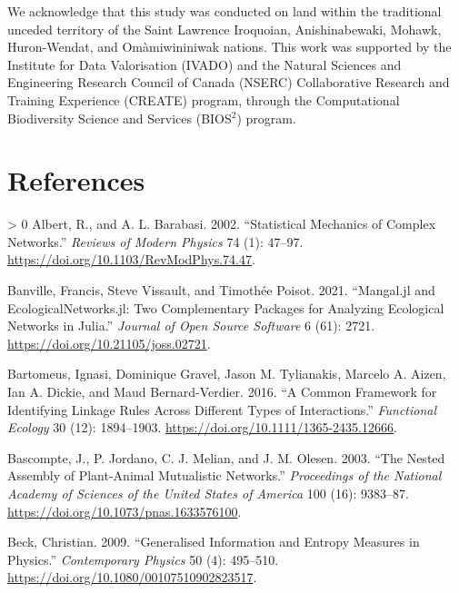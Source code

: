 \documentclass[10pt,oneside]{article}
\newlength{\cslhangindent}
\newenvironment{CSLReferences}[3] %
 {%
  \setlength{\parindent}{0pt}
  \ifodd #1 \everypar{\setlength{\hangindent}{\cslhangindent}}\ignorespaces\fi
  \ifnum #2 > 0
  \setlength{\parskip}{#2\baselineskip}
  \fi
 }%
 {}
\begin{document}
We acknowledge that this study was conducted on land within the
traditional unceded territory of the Saint Lawrence Iroquoian,
Anishinabewaki, Mohawk, Huron-Wendat, and Omàmiwininiwak nations. This
work was supported by the Institute for Data Valorisation (IVADO) and
the Natural Sciences and Engineering Research Council of Canada (NSERC)
Collaborative Research and Training Experience (CREATE) program, through
the Computational Biodiversity Science and Services (BIOS\(^2\))
program.

\hypertarget{references}{%
\section*{References}\label{references}}

\hypertarget{refs}{}
\begin{CSLReferences}{1}{0}
\leavevmode\hypertarget{ref-Albert2002StaMec}{}%
Albert, R., and A. L. Barabasi. 2002. {``Statistical Mechanics of
Complex Networks.''} \emph{Reviews of Modern Physics} 74 (1): 47--97.
\url{https://doi.org/10.1103/RevModPhys.74.47}.

\leavevmode\hypertarget{ref-Banville2021ManJla}{}%
Banville, Francis, Steve Vissault, and Timothée Poisot. 2021.
{``Mangal.jl and EcologicalNetworks.jl: Two Complementary Packages for
Analyzing Ecological Networks in Julia.''} \emph{Journal of Open Source
Software} 6 (61): 2721. \url{https://doi.org/10.21105/joss.02721}.

\leavevmode\hypertarget{ref-Bartomeus2016ComFra}{}%
Bartomeus, Ignasi, Dominique Gravel, Jason M. Tylianakis, Marcelo A.
Aizen, Ian A. Dickie, and Maud Bernard-Verdier. 2016. {``A Common
Framework for Identifying Linkage Rules Across Different Types of
Interactions.''} \emph{Functional Ecology} 30 (12): 1894--1903.
\url{https://doi.org/10.1111/1365-2435.12666}.

\leavevmode\hypertarget{ref-Bascompte2003NesAssa}{}%
Bascompte, J., P. Jordano, C. J. Melian, and J. M. Olesen. 2003. {``The
Nested Assembly of Plant-Animal Mutualistic Networks.''}
\emph{Proceedings of the National Academy of Sciences of the United
States of America} 100 (16): 9383--87.
\url{https://doi.org/10.1073/pnas.1633576100}.

\leavevmode\hypertarget{ref-Beck2009GenInf}{}%
Beck, Christian. 2009. {``Generalised Information and Entropy Measures
in Physics.''} \emph{Contemporary Physics} 50 (4): 495--510.
\url{https://doi.org/10.1080/00107510902823517}.


\end{CSLReferences}
\end{document}
